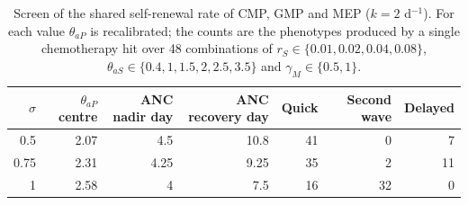 \begin{table}[!htbp]
\centering
\small
\setlength{\tabcolsep}{3.5pt}
\caption{Screen of the shared self-renewal rate of CMP, GMP and MEP ($k=2$ d$^{-1}$). For each value $\theta_{aP}$ is recalibrated; the counts are the phenotypes produced by a single chemotherapy hit over 48 combinations of $r_S\in\{0.01,0.02,0.04,0.08\}$, $\theta_{aS}\in\{0.4,1,1.5,2,2.5,3.5\}$ and $\gamma_M\in\{0.5,1\}$.}
\label{tab:screen}
\begin{tabular}{rrrrrrr}
\toprule
$\sigma$ & $\theta_{aP}$ centre & ANC nadir day & ANC recovery day & Quick & Second wave & Delayed \\
\midrule
0.5 & 2.07 & 4.5 & 10.8 & 41 & 0 & 7 \\
0.75 & 2.31 & 4.25 & 9.25 & 35 & 2 & 11 \\
1 & 2.58 & 4 & 7.5 & 16 & 32 & 0 \\
\bottomrule
\end{tabular}
\end{table}
